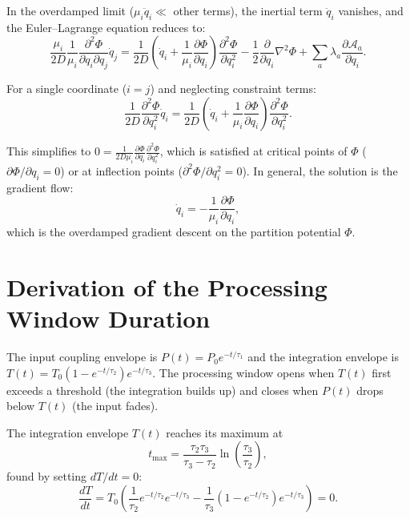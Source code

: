 \documentclass[twocolumn,10pt]{article}
\theoremstyle{remark}
\begin{document}
In the overdamped limit ($\mu_i \ddot{q}_i \ll$ other terms), the inertial term $\ddot{q}_i$ vanishes, and the Euler--Lagrange equation reduces to:
\begin{equation}
\frac{\mu_i}{2D}\frac{1}{\mu_i}\frac{\partial^2\Phi}{\partial q_i \partial q_j}\dot{q}_j = \frac{1}{2D}\!\left(\dot{q}_i + \frac{1}{\mu_i}\frac{\partial\Phi}{\partial q_i}\right)\frac{\partial^2\Phi}{\partial q_i^2} - \frac{1}{2}\frac{\partial}{\partial q_i}\nabla^2\Phi + \sum_a \lambda_a \frac{\partial\mathcal{A}_a}{\partial q_i}.
\end{equation}

For a single coordinate ($i = j$) and neglecting constraint terms:
\begin{equation}
\frac{1}{2D}\frac{\partial^2\Phi}{\partial q_i^2}\dot{q}_i = \frac{1}{2D}\!\left(\dot{q}_i + \frac{1}{\mu_i}\frac{\partial\Phi}{\partial q_i}\right)\frac{\partial^2\Phi}{\partial q_i^2}.
\end{equation}

This simplifies to $0 = \frac{1}{2D\mu_i}\frac{\partial\Phi}{\partial q_i}\frac{\partial^2\Phi}{\partial q_i^2}$, which is satisfied at critical points of $\Phi$ ($\partial\Phi/\partial q_i = 0$) or at inflection points ($\partial^2\Phi/\partial q_i^2 = 0$). In general, the solution is the gradient flow:
\begin{equation}
\dot{q}_i = -\frac{1}{\mu_i}\frac{\partial\Phi}{\partial q_i},
\end{equation}
which is the overdamped gradient descent on the partition potential $\Phi$.

\section{Derivation of the Processing Window Duration}
\label{app:window}

The input coupling envelope is $P(t) = P_0 e^{-t/\tau_1}$ and the integration envelope is $T(t) = T_0(1 - e^{-t/\tau_2})e^{-t/\tau_3}$. The processing window opens when $T(t)$ first exceeds a threshold (the integration builds up) and closes when $P(t)$ drops below $T(t)$ (the input fades).

The integration envelope $T(t)$ reaches its maximum at
\begin{equation}
t_{\max} = \frac{\tau_2 \tau_3}{\tau_3 - \tau_2} \ln\!\left(\frac{\tau_3}{\tau_2}\right),
\end{equation}
found by setting $dT/dt = 0$:
\begin{equation}
\frac{dT}{dt} = T_0\!\left(\frac{1}{\tau_2}e^{-t/\tau_2}e^{-t/\tau_3} - \frac{1}{\tau_3}(1 - e^{-t/\tau_2})e^{-t/\tau_3}\right) = 0.
\end{equation}
\end{document}
